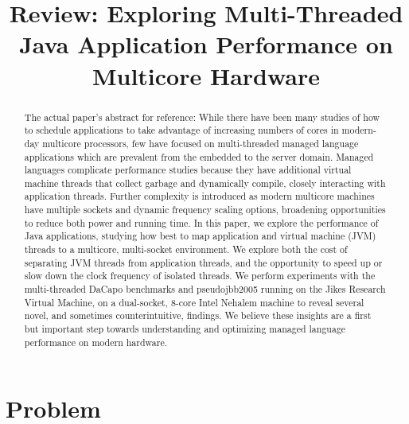 \documentclass[conference]{IEEEtran}
\begin{document}
\title{Review: Exploring Multi-Threaded Java Application Performance on Multicore Hardware}

\author{
}

\maketitle

\begin{abstract}
The actual paper's abstract for reference: While there have been many studies of how to schedule applications to take advantage of increasing numbers of cores
in modern-day multicore processors, few have focused on
multi-threaded managed language applications which are
prevalent from the embedded to the server domain. Managed
languages complicate performance studies because they
have additional virtual machine threads that collect garbage
and dynamically compile, closely interacting with application threads. Further complexity is introduced as modern
multicore machines have multiple sockets and dynamic frequency scaling options, broadening opportunities to reduce
both power and running time.
In this paper, we explore the performance of Java applications, studying how best to map application and virtual machine (JVM) threads to a multicore, multi-socket environment. We explore both the cost of separating JVM threads
from application threads, and the opportunity to speed up or
slow down the clock frequency of isolated threads. We perform experiments with the multi-threaded DaCapo benchmarks and pseudojbb2005 running on the Jikes Research
Virtual Machine, on a dual-socket, 8-core Intel Nehalem
machine to reveal several novel, and sometimes counterintuitive, ﬁndings. We believe these insights are a ﬁrst but
important step towards understanding and optimizing managed language performance on modern hardware.
\end{abstract}

\section{Problem}
\label{sec:problem}
\end{document}
